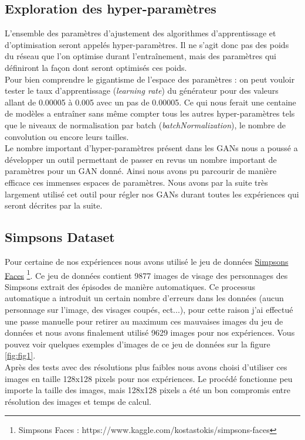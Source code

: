 \documentclass[11pt,francais]{article}
\begin{document}
\subsection{Exploration des hyper-paramètres}
\label{sec:ParamsScans}
L'ensemble des paramètres d'ajustement des algorithmes d'apprentissage et d'optimisation seront appelés hyper-paramètres. Il ne s'agit donc pas des poids du réseau que l'on optimise durant l'entraînement, mais des paramètres qui définiront la façon dont seront optimisés ces poids.\\
Pour bien comprendre le gigantisme de l'espace des paramètres : on peut vouloir tester le taux d'apprentissage (\textit{learning rate}) du générateur pour des valeurs allant de 0.00005 à 0.005 avec un pas de 0.00005. Ce qui nous ferait une centaine de modèles a entraîner sans même compter tous les autres hyper-paramètres tels que le niveaux de normalisation par batch (\textit{batchNormalization}), le nombre de convolution ou encore leurs tailles.\\
Le nombre important d'hyper-paramètres présent dans les GANs nous a poussé a développer un outil permettant de passer en revus un nombre important de paramètres pour un GAN donné.
Ainsi nous avons pu parcourir de manière efficace ces immenses espaces de paramètres. Nous avons par la suite très largement utilisé cet outil pour régler nos GANs durant toutes les expériences qui seront décrites par la suite.

\subsection{Simpsons Dataset}
\label{sec:SimpsonsDataset}
Pour certaine de nos expériences nous avons utilisé le jeu de données \href{https://www.kaggle.com/kostastokis/simpsons-faces}{Simpsons Faces} \footnote{\label{note2}Simpsons Faces : https://www.kaggle.com/kostastokis/simpsons-faces}. Ce jeu de données contient 9877 images de visage des personnages des Simpsons extrait des épisodes de manière automatiques. Ce processus automatique a introduit un certain nombre d'erreurs dans les données (aucun personnage sur l'image, des visages coupés, ect...), pour cette raison j'ai effectué une passe manuelle pour retirer au maximum ces mauvaises images du jeu de données et nous avons finalement utilisé 9629 images pour nos expériences. Vous pouvez voir quelques exemples d'images de ce jeu de données sur la figure \ref{fig:fig1}.\\
Après des tests avec des résolutions plus faibles nous avons choisi d'utiliser ces images en taille 128x128 pixels pour nos expériences. Le procédé fonctionne peu importe la taille des images, mais 128x128 pixels a été un bon compromis entre résolution des images et temps de calcul.
\end{document}

